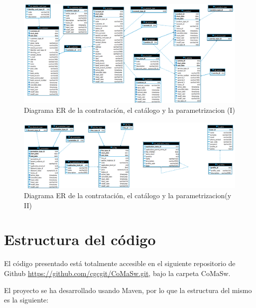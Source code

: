\begin{landscape}

\begin{figure}[hp!]
  \centering
  \includegraphics[width=1\textwidth]{imaxes/er-instancia-01.png}          	  \caption{Diagrama ER de la contratación, el catálogo y la parametrizacion (I)}
  \label{fig:er-instancia-01}
\end{figure}

\begin{figure}[hp!]
  \centering
  \includegraphics[width=1\textwidth]{imaxes/er-instancia-02.png}
  \caption{Diagrama ER de la contratación, el catálogo y la parametrizacion(y II)}
  \label{fig:er-instancia-02}
\end{figure}


\end{landscape}


\section{Estructura del código}
\label{chap:estructuraCodigo}

El código presentado está totalmente accesible en el siguiente repositorio de Github \url{https://github.com/cgcgit/CoMaSw.git}, bajo la carpeta CoMaSw.

El proyecto se ha desarrollado usando Maven, por lo que la estructura del mismo es la siguiente:


